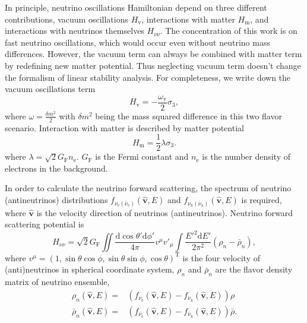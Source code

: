 \documentclass[%
preprint,
 amsmath,amssymb,
 aps,
 prd
]{revtex4-1}
\begin{document}
In principle, neutrino oscillations Hamiltonian depend on three different contributions, vacuum oscillations $H_{\mathrm v}$, interactions with matter $H_{\mathrm m}$, and interactions with neutrinos themselves $H_{\nu\nu}$. The concentration of this work is on fast neutrino oscillations, which would occur even without neutrino mass differences. However, the vacuum term can always be combined with matter term by redefining new matter potential. Thus neglecting vacuum term doesn't change the formalism of linear stability analysis. For completeness, we write down the vacuum oscillations term
\begin{equation}
   H_{\mathrm v} = -\frac{\omega_{\mathrm v}}{2} \sigma_3,
\end{equation}
where $\omega = \frac{\delta m^2}{2}$ with $\delta m^2$ being the mass squared difference in this two flavor scenario. Interaction with matter is described by matter potential
\begin{equation}
   H_{\mathrm m} = \frac{1}{2}\lambda \sigma_3.
\end{equation}
where $\lambda = \sqrt{2}G_{\mathrm F} n_{\mathrm e}$. $G_{\mathrm F}$ is the Fermi constant and $n_{\mathrm e}$ is the number density of electrons in the background.

In order to calculate the neutrino forward scattering, the spectrum of neutrino (antineutrinos) distributions $f_{\nu_{\mathrm e}(\bar \nu_{\mathrm e})}(\hat{\mathbf v}, E)$ and $f_{\nu_{\mathrm x}(\bar \nu_{\mathrm x})}(\hat{\mathbf v}, E)$ is required, where $\hat{\mathbf v}$ is the velocity direction of neutrinos (antineutrinos). Neutrino forward scattering potential is
\begin{equation}
H_{\nu\nu} = \sqrt{2} G_{\mathrm F} \iint \frac{\mathrm d \cos\theta' \mathrm d\phi'}{4\pi} v^\mu v'_\mu \int \frac{E'^2 \mathrm d E'}{2\pi^2} ( \rho_n -  \bar\rho_n ),
\end{equation}
where $v^\mu = ( 1, \sin\theta\cos\phi, \sin\theta\sin\phi, \cos\theta )^{\mathrm T}$ is the four velocity of (anti)neutrinos in spherical coordinate system, $\rho_n$ and $\bar \rho_n$ are the flavor density matrix of neutrino ensemble,
\begin{align}
\rho_n(\hat{\mathbf v},E) = & \left(f_{\nu_{\mathrm e}}(\hat{\mathbf v},E) - f_{\nu_{\mathrm x}}(\hat{\mathbf v},E) \right) \rho \\
\bar\rho_n(\hat{\mathbf v},E) = & \left( f_{\bar\nu_{\mathrm e}}(\hat{\mathbf v},E) - f_{\bar\nu_{\mathrm x}}(\hat{\mathbf v},E)  \right)\bar \rho.
\end{align}
\end{document}
